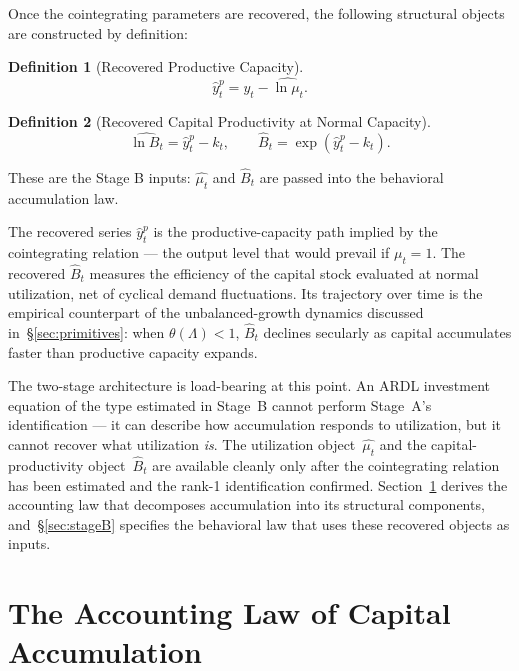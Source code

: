 \documentclass[12pt,letterpaper]{article}
\newcommand{\mut}{\mu_t}           %
\newcommand{\thetaL}{\theta(\Lambda)}  %
\newcommand{\Bt}{B_t}              %
\newtheorem{definition}{Definition}[section]
\begin{document}
Once the cointegrating parameters are recovered, the following structural
objects are constructed by definition:

\begin{definition}[Recovered Productive Capacity]
\label{def:yp}
\begin{equation}
  \hat{y}^p_t = y_t - \widehat{\ln\mut}.
  \label{eq:yp_hat}
\end{equation}
\end{definition}

\begin{definition}[Recovered Capital Productivity at Normal Capacity]
\label{def:B}
\begin{equation}
  \widehat{\ln\Bt} = \hat{y}^p_t - k_t,
  \qquad
  \hat{B}_t = \exp\!\left(\hat{y}^p_t - k_t\right).
  \label{eq:B_hat}
\end{equation}
\end{definition}

These are the Stage B inputs: $\widehat{\mut}$ and $\hat{B}_t$ are
passed into the behavioral accumulation law.

The recovered series $\hat{y}^p_t$ is the productive-capacity path implied by
the cointegrating relation --- the output level that would prevail if
$\mut = 1$. The recovered $\hat{B}_t$ measures the efficiency of the capital
stock evaluated at normal utilization, net of cyclical demand fluctuations. Its
trajectory over time is the empirical counterpart of the unbalanced-growth
dynamics discussed in~\S\ref{sec:primitives}: when $\thetaL < 1$, $\hat{B}_t$
declines secularly as capital accumulates faster than productive capacity
expands.

The two-stage architecture is load-bearing at this point. An ARDL investment
equation of the type estimated in Stage~B cannot perform Stage~A's
identification --- it can describe how accumulation responds to utilization, but
it cannot recover what utilization \emph{is}. The utilization
object~$\widehat{\mut}$ and the capital-productivity object~$\hat{B}_t$ are
available cleanly only after the cointegrating relation has been estimated and
the rank-1 identification confirmed. Section~\ref{sec:accounting} derives the
accounting law that decomposes accumulation into its structural components,
and~\S\ref{sec:stageB} specifies the behavioral law that uses these recovered
objects as inputs.


\section{The Accounting Law of Capital Accumulation}
\label{sec:accounting}
\end{document}
